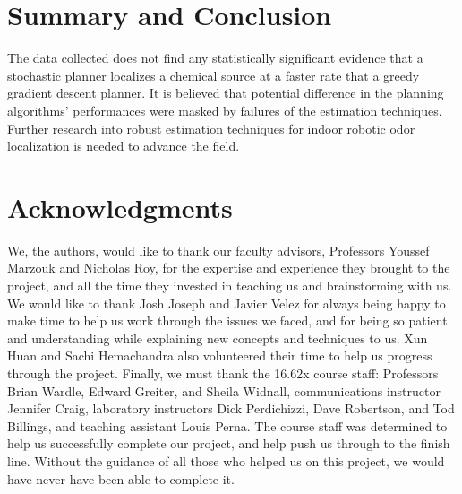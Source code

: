 \documentclass[submit, 12pt]{aiaa-pretty-modified}
\begin{document}
\section{Summary and Conclusion}
The data collected does not find any statistically significant evidence that a
stochastic planner localizes a chemical source at a faster rate that a greedy
gradient descent planner. It is believed that potential difference in the planning
algorithms' performances were masked by failures of the estimation techniques.
Further research into robust estimation techniques for indoor robotic odor
localization is needed to advance the field.

\section{Acknowledgments}
We, the authors, would like to thank our faculty advisors, Professors Youssef
Marzouk and Nicholas Roy, for the expertise and experience they brought to the
project, and all the time they invested in teaching us and brainstorming with
us. We would like to thank Josh Joseph and Javier Velez for always being happy
to make time to help us work through the issues we faced, and for being so
patient and understanding while explaining new concepts and techniques to us.
Xun Huan and Sachi Hemachandra also volunteered their time to help us progress
through the project. Finally, we must thank the 16.62x course staff: Professors
Brian Wardle, Edward Greiter, and Sheila Widnall, communications instructor
Jennifer Craig, laboratory instructors Dick Perdichizzi, Dave Robertson, and Tod
Billings, and teaching assistant Louis Perna. The course staff was determined to
help us successfully complete our project, and help push us through to the
finish line. Without the guidance of all those who helped us on this project, we
would have never have been able to complete it.


\newpage


\nocite{*}

\newpage
\appendix
\end{document}
